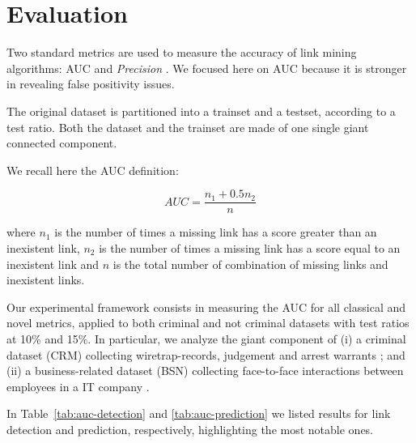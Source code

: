 \section{Evaluation}
\label{sec:evaluation}

Two standard metrics are used to measure the accuracy of link mining algorithms: AUC and  \textit{Precision} \cite{Lu2011}. We focused here on AUC because it is stronger in revealing false positivity issues.

The original dataset is partitioned into a trainset and a testset, according to a test ratio. Both the dataset and the trainset are made of one single giant connected component.

We recall here the AUC definition:

\begin{equation}
\label{eqn:auc}
AUC=\frac{n_{1}+0.5n_{2}}{n}
\end{equation}

where 
$n_{1}$ is the number of times a missing link has a score greater than an inexistent link,
$n_{2}$ is the number of times a missing link has a score equal to an inexistent link and
$n$ is the total number of combination of missing links and inexistent links.

Our experimental framework consists in measuring the AUC for all classical and novel metrics, applied to both criminal and not criminal datasets with test ratios at 10\% and 15\%.
In particular, we analyze the giant component of
(i) a criminal dataset (CRM) collecting wiretrap-records, judgement and arrest warrants \cite{berlusconi2016link}; and
(ii) a business-related dataset (BSN) collecting face-to-face interactions between employees in a IT company \cite{olguin2009sensible}.

In Table~\ref{tab:auc-detection} and \ref{tab:auc-prediction} we listed results for link detection and prediction, respectively, highlighting the most notable ones.



